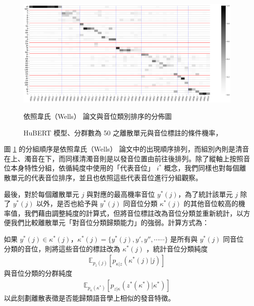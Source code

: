 \begin{figure}
    \centering
    \includegraphics[width=1\linewidth]{figures/hubert-50-givenunit-byphn.png}
    \caption[]{%
        HuBERT 模型、分群數為 50 之離散單元與音位標註的條件機率，}
                                                    依照韋氏（Wells） \cite{wells_phonetic_2022} 論文與音位類別排序的分佈圖
    \label{fig:hubert-50-givenunit-byphn}
\end{figure}

        圖 \ref{fig:hubert-50-givenunit-byphn} 的分組順序是依照韋氏（Wells） \cite{wells_phonetic_2022} 論文中的出現順序排列，而組別內則是清音在上、濁音在下，而同樣清濁音則是以發音位置由前往後排列。除了縱軸上按照音位本身特性分組，依循純度中使用的「代表音位」 $i^\ast$ 概念，我們同樣也對每個離散單元的代表音位排序，並且也依照這些代表音位進行分組觀察。

        最後，對於每個離散單元 $j$ 與對應的最高機率音位 $y^*(j)$，為了統計該單元 $j$ 除了 $y^*(j)$ 以外，是否也給予與 $y^*(j)$ 同音位分類 $\kappa^*(j)$ 的其他音位較高的機率值，我們藉由調整純度的計算式，但將音位標註改為音位分類並重新統計，以方便我們比較離散單元「對音位分類歸類能力」的強弱。計算方式為：

        如果 $y^*(j) \in \kappa^*(j)$，$ \kappa^*(j) = \{y^*(j), y', y'', \cdots\cdots\}$  是所有與  $y^*(j)$ 同音位分類的音位，則將這些音位的標註改為 $ \kappa^*(j) $ ，統計音位分類純度
\begin{align}
    \mathbb{E}_{p_z(j)}\left[p_{ \kappa|z}( \kappa^*(j)|j) \right]
\end{align}
與音位分類的分群純度
\begin{align}
    \mathbb{E}_{p_ \kappa(\kappa^*)}\left[p_{z| \kappa}(z^*( \kappa^*)|\kappa^*) \right]
\end{align}
以此刻劃離散表徵是否能歸類語音學上相似的發音特徵。


